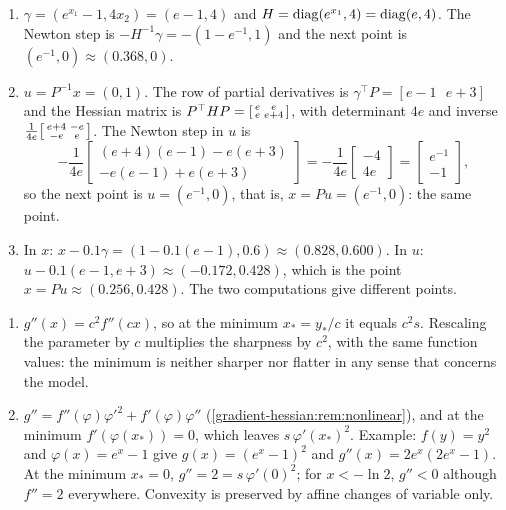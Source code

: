 \begin{enumerate}[nosep]
  \item $\gamma = (e^{x_1} - 1, 4x_2) = (e - 1, 4)$ and
        $H = \operatorname{diag}(e^{x_1}, 4) = \operatorname{diag}(e, 4)$. The Newton step is
        $-H^{-1}\gamma = -(1 - e^{-1}, 1)$ and the next point is
        $(e^{-1}, 0)\approx(0.368, 0)$.
  \item $u = P^{-1}x = (0, 1)$. The row of partial derivatives is
        $\gamma^\top P = [e - 1\ \ \ e + 3]$ and the Hessian matrix is
        $P^\top HP = \begin{bsmallmatrix}e & e\\e & e + 4
        \end{bsmallmatrix}$, with determinant $4e$ and inverse
        $\frac1{4e}\begin{bsmallmatrix}e + 4 & -e\\-e & e
        \end{bsmallmatrix}$. The Newton step in $u$ is
        \[
          -\frac1{4e}\begin{bmatrix}(e + 4)(e - 1) - e(e + 3)\\
          -e(e - 1) + e(e + 3)\end{bmatrix}
          = -\frac1{4e}\begin{bmatrix}-4\\4e\end{bmatrix}
          = \begin{bmatrix}e^{-1}\\-1\end{bmatrix} ,
        \]
        so the next point is $u = (e^{-1}, 0)$, that is,
        $x = Pu = (e^{-1}, 0)$: the same point.
  \item In $x$: $x - 0.1\gamma = (1 - 0.1(e - 1), 0.6)
        \approx(0.828, 0.600)$. In $u$:
        $u - 0.1(e - 1, e + 3)\approx(-0.172, 0.428)$, which is the point
        $x = Pu\approx(0.256, 0.428)$. The two computations give
        different points.
\end{enumerate}

\begin{enumerate}[nosep]
  \item $g''(x) = c^2f''(cx)$, so at the minimum $x_* = y_*/c$ it equals
        $c^2s$. Rescaling the parameter by $c$ multiplies the sharpness
        by $c^2$, with the same function values: the minimum is neither
        sharper nor flatter in any sense that concerns the model.
  \item $g'' = f''(\varphi)\varphi'^2 + f'(\varphi)\varphi''$
        (\cref{gradient-hessian:rem:nonlinear}), and at the minimum
        $f'(\varphi(x_*)) = 0$, which leaves $s\,\varphi'(x_*)^2$.
        Example: $f(y) = y^2$ and $\varphi(x) = e^x - 1$ give
        $g(x) = (e^x - 1)^2$ and $g''(x) = 2e^x(2e^x - 1)$. At the minimum
        $x_* = 0$, $g'' = 2 = s\,\varphi'(0)^2$; for $x < -\ln2$,
        $g'' < 0$ although $f'' = 2$ everywhere. Convexity is preserved
        by affine changes of variable only.
\end{enumerate}

